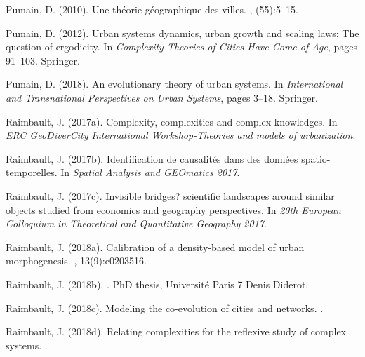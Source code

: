 \documentclass[11pt]{article}
\begin{document}
\begin{thebibliography}{}
Pumain, D. (2010).
\newblock Une th{\'e}orie g{\'e}ographique des villes.
,
  (55):5--15.

Pumain, D. (2012).
\newblock Urban systems dynamics, urban growth and scaling laws: The question
  of ergodicity.
\newblock In {\em Complexity Theories of Cities Have Come of Age}, pages
  91--103. Springer.

Pumain, D. (2018).
\newblock An evolutionary theory of urban systems.
\newblock In {\em International and Transnational Perspectives on Urban
  Systems}, pages 3--18. Springer.

Raimbault, J. (2017a).
\newblock Complexity, complexities and complex knowledges.
\newblock In {\em ERC GeoDiverCity International Workshop-Theories and models
  of urbanization}.

Raimbault, J. (2017b).
\newblock Identification de causalit{\'e}s dans des donn{\'e}es
  spatio-temporelles.
\newblock In {\em Spatial Analysis and GEOmatics 2017}.

Raimbault, J. (2017c).
\newblock Invisible bridges? scientific landscapes around similar objects
  studied from economics and geography perspectives.
\newblock In {\em 20th European Colloquium in Theoretical and Quantitative
  Geography 2017}.

Raimbault, J. (2018a).
\newblock Calibration of a density-based model of urban morphogenesis.
, 13(9):e0203516.

Raimbault, J. (2018b).
.
\newblock PhD thesis, Universit{\'e} Paris 7 Denis Diderot.

Raimbault, J. (2018c).
\newblock Modeling the co-evolution of cities and networks.
.

Raimbault, J. (2018d).
\newblock Relating complexities for the reflexive study of complex systems.
.


\end{thebibliography}
\end{document}
